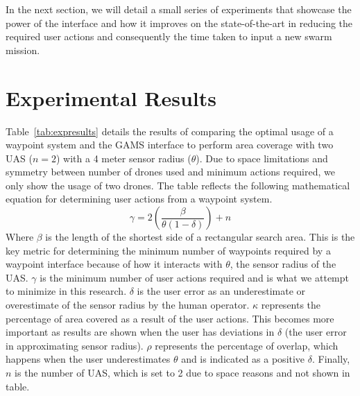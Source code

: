 \documentclass{sig-alternate-ipsn13}
\begin{document}
In the next section, we will detail a small series of experiments that showcase the
power of the interface and how it improves on the state-of-the-art in reducing the
required user actions and consequently the time taken to input a new swarm mission.

\section{Experimental Results}
\label{sec:exp}

Table~\ref{tab:expresults} details the results of comparing the optimal usage of
a waypoint system and the GAMS interface to perform area coverage with
two UAS ($n=2$) with a 4 meter sensor radius ($\theta$). Due to space limitations and
symmetry between number of drones used and minimum actions required, we
only show the usage of two drones. The table reflects the following
mathematical equation for determining user actions from a waypoint system.
%
\[
\gamma = 2 \left (\frac {\beta} {\theta (1 - \delta)} \right) + n
\]
%
Where $\beta$ is the length of the shortest side of a rectangular search area.
This is the key metric for determining the minimum number of waypoints required
by a waypoint interface
because of how it interacts with $\theta$, the sensor radius of the UAS. $\gamma$ is
the minimum number of user actions required and is what we attempt to minimize in this
research. $\delta$ is
the user error as an underestimate or overestimate of the sensor radius by the
human operator. $\kappa$ represents the percentage of area covered as a result
of the user actions. This becomes more important as results are shown when the
user has deviations in $\delta$ (the user error in approximating sensor radius).
$\rho$ represents the percentage of overlap, which happens when the user
underestimates $\theta$ and is indicated as a positive $\delta$.
Finally,
$n$ is the number of UAS, which is set to 2 due to space reasons and not shown in table.
\end{document}
